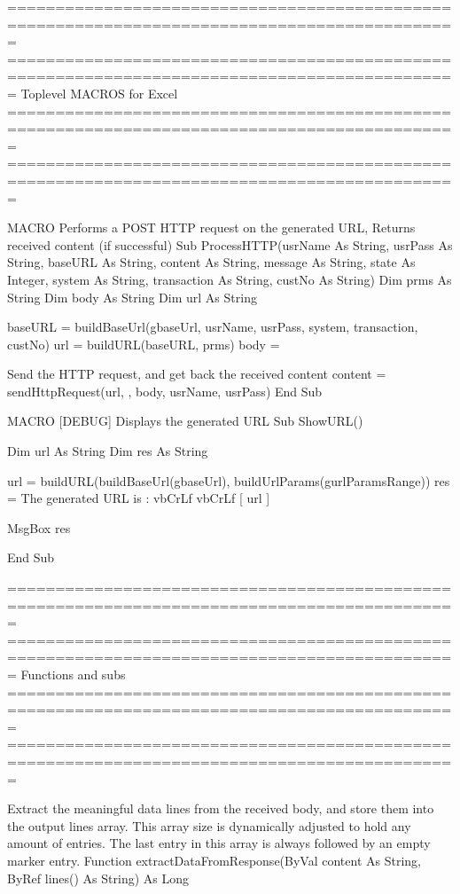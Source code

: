 \documentclass[letterpaper,10pt,english]{sphinxmanual}
\begin{document}
\begin{sphinxVerbatim}[commandchars=\\\{\}]
\PYGZsq{}=============================================================================================
\PYGZsq{}=============================================================================================
\PYGZsq{}
\PYGZsq{}   Top\PYGZhy{}level MACROS for Excel
\PYGZsq{}
\PYGZsq{}=============================================================================================
\PYGZsq{}=============================================================================================

\PYGZsq{} \PYGZhy{} MACRO \PYGZhy{}
\PYGZsq{} \PYGZgt{} Performs a POST HTTP request on the generated URL,
\PYGZsq{} \PYGZgt{} Returns received content (if successful)
\PYGZsq{}
Sub ProcessHTTP(usrName As String, usrPass As String, baseURL As String, content As String, message As String, state As Integer, system As String, transaction As String, custNo As String)
   Dim prms As String
   Dim body As String
   Dim url As String


   baseURL = buildBaseUrl(g\PYGZus{}baseUrl, usrName, usrPass, system, transaction, custNo)
   url = buildURL(baseURL, prms)
   body = \PYGZdq{}\PYGZdq{}

   \PYGZsq{} Send the HTTP request, and get back the received content
   content = sendHttpRequest(url, , body, usrName, usrPass)
End Sub


\PYGZsq{} \PYGZhy{} MACRO \PYGZhy{} [DEBUG] \PYGZhy{}
\PYGZsq{} Displays the generated URL
\PYGZsq{}
Sub ShowURL()

   Dim url As String
   Dim res As String

   url = buildURL(buildBaseUrl(g\PYGZus{}baseUrl), buildUrlParams(g\PYGZus{}urlParamsRange))
   res = \PYGZdq{}The generated URL is :\PYGZdq{} \PYGZam{} vbCrLf \PYGZam{} vbCrLf \PYGZam{} \PYGZdq{}[\PYGZdq{} \PYGZam{} url \PYGZam{} \PYGZdq{}]\PYGZdq{}

   MsgBox res

End Sub


\PYGZsq{}=============================================================================================
\PYGZsq{}=============================================================================================
\PYGZsq{}
\PYGZsq{}   Functions and subs
\PYGZsq{}
\PYGZsq{}=============================================================================================
\PYGZsq{}=============================================================================================

\PYGZsq{} Extract the meaningful data lines from the received body, and store them into
\PYGZsq{} the output lines array. This array size is dynamically adjusted to hold any amount of entries.
\PYGZsq{} The last entry in this array is always followed by an empty marker entry.
\PYGZsq{}
Function extractDataFromResponse(ByVal content As String, ByRef lines() As String) As Long


\end{sphinxVerbatim}
\end{document}
